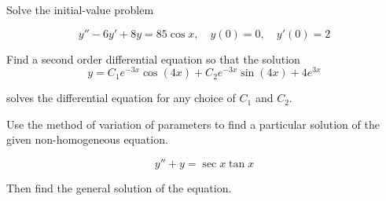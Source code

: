 \begin{mdframed}
    \vspace{-0.25cm}
    \hspace{-0.25cm}
    \begin{Exercise}
        Solve the initial-value problem

        \[
            y'' - 6y' + 8y = 85\cos x, \quad y(0) = 0, \quad y'(0) = 2
        \]
    \end{Exercise}

    \begin{Exercise}
        Find a second order differential equation so that the solution
        \[
            y = C_1 e^{-3x} \cos(4x) + C_2 e^{-3x} \sin(4x) + 4e^{3x}
        \]

        solves the differential equation for any choice of $C_1$ and $C_2$.
    \end{Exercise}

    \begin{Exercise}
        Use the method of variation of parameters to find a particular solution 
        of the given non-homogeneous equation. 
        
        \[
            y'' + y = \sec x \tan x
        \]
        
        Then find the general solution 
        of the equation.
    \end{Exercise}
\end{mdframed}